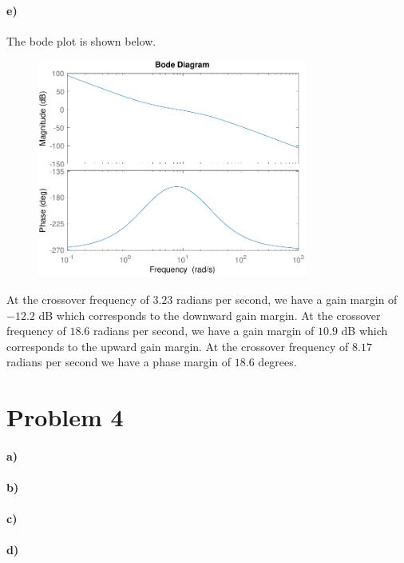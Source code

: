 \documentclass[12pt]{article}
\begin{document}
\paragraph{e)}

The bode plot is shown below.
\begin{figure}[H]
    \begin{center}
        \includegraphics[width=3.5in]{problem3e.pdf}
    \end{center}
\end{figure}
At the crossover frequency of \(3.23\) radians per second, we have a gain margin of \(-12.2\) dB which corresponds
to the downward gain margin. At the crossover frequency of \(18.6\) radians per second, we have a gain margin of
\(10.9\) dB which corresponds to the upward gain margin. At the crossover frequency of \(8.17\) radians per
second we have a phase margin of \(18.6\) degrees.

\section*{Problem 4}

\paragraph{a)}

\paragraph{b)}

\paragraph{c)}

\paragraph{d)}
\end{document}
